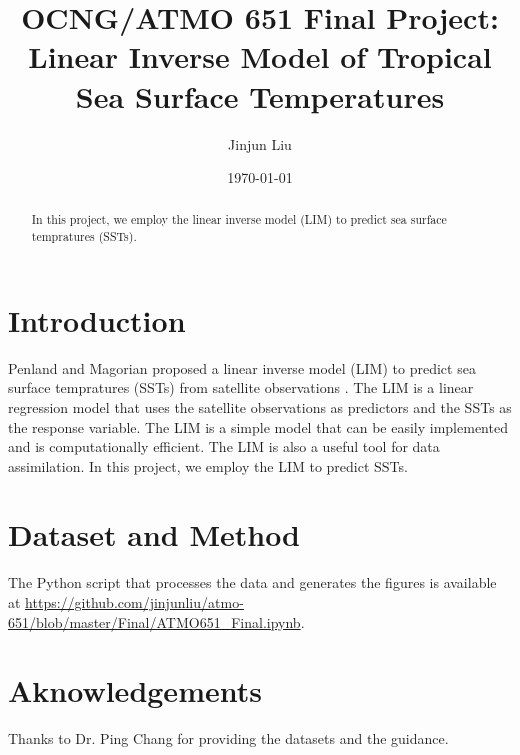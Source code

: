 \documentclass[12pt,a4paper]{article}
\title{OCNG/ATMO 651 Final Project: Linear Inverse Model of Tropical Sea Surface Temperatures}
\author{Jinjun Liu}
\date{\today}
\begin{document}
\maketitle
\thispagestyle{empty}
\begin{abstract}

In this project, we employ the linear inverse model (LIM) to predict sea surface tempratures (SSTs).

\end{abstract}

\tableofcontents

\clearpage %

\section{Introduction} %

Penland and Magorian proposed a linear inverse model (LIM) to predict sea surface tempratures (SSTs) from satellite observations \cite{Penland1993}. The LIM is a linear regression model that uses the satellite observations as predictors and the SSTs as the response variable. The LIM is a simple model that can be easily implemented and is computationally efficient. The LIM is also a useful tool for data assimilation. In this project, we employ the LIM to predict SSTs.

\section{Dataset and Method}\label{dataset-method}

The Python script that processes the data and generates the figures is available at \url{https://github.com/jinjunliu/atmo-651/blob/master/Final/ATMO651\_Final.ipynb}.

\section{Aknowledgements}\label{acknowledgements}

Thanks to Dr. Ping Chang for providing the datasets and the guidance.



\end{document}
